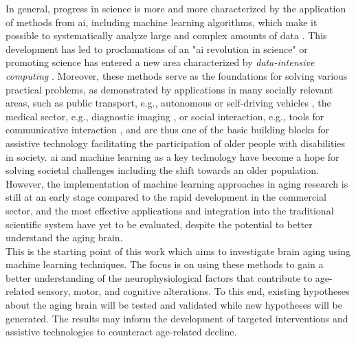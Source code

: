 In general, progress in science is more and more characterized by the application of methods from \gls{ai}, including machine learning algorithms, which make it possible to systematically analyze large and complex amounts of data \cite{Brunton2019}. This development has led to proclamations of an "\gls{ai} revolution in science" \cite{Appenzeller2017} or promoting science has entered a new area characterized by \textit{data-intensive computing} \cite{Hey2009}. Moreover, these methods serve as the foundations for solving various practical problems, as demonstrated by applications in many socially relevant areas, such as public transport, e.g., autonomous or self-driving vehicles \cite{Leonard2020}, the medical sector, e.g., diagnostic imaging \cite{Liu2020}, or social interaction, e.g., tools for communicative interaction \cite{Adamopoulou2020}, and are thus one of the basic building blocks for assistive technology facilitating the participation of older people with disabilities in society. \Gls{ai} and machine learning as a key technology have become a hope for solving societal challenges including the shift towards an older population.\\
However, the implementation of machine learning approaches in aging research is still at an early stage compared to the rapid development in the commercial sector, and the most effective applications and integration into the traditional scientific system have yet to be evaluated, despite the potential to better understand the aging brain.\\
This is the starting point of this work which aims to investigate brain aging using machine learning techniques. The focus is on using these methods to gain a better understanding of the neurophysiological factors that contribute to age-related sensory, motor, and cognitive alterations. To this end, existing hypotheses about the aging brain will be tested and validated while new hypotheses will be generated. The results may inform the development of targeted interventions and assistive technologies to counteract age-related decline.


